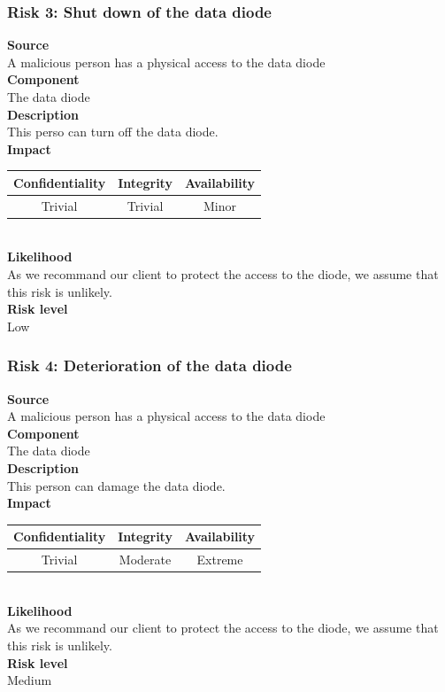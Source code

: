 \documentclass[a4paper,11pt]{article}
\begin{document}
\subsubsection{Risk 3: Shut down of the data diode }
\textbf{Source} \\A malicious person has a physical access to the data diode\\
\textbf{Component} \\The data diode\\
\textbf{Description}\\ This perso can turn off the data diode. \\
\textbf{Impact}\\
\begin{tabular}{|c|c|c|}
\hline
Confidentiality & Integrity & Availability \\
\hline
Trivial & Trivial & Minor \\
\hline
\end{tabular}\\
\textbf{Likelihood}\\ As we recommand our client to protect the access to the diode, we assume that this risk is unlikely.\\
\textbf{Risk level}\\Low\\

\subsubsection{Risk 4: Deterioration of the data diode }
\textbf{Source} \\A malicious person has a physical access to the data diode\\
\textbf{Component} \\The data diode\\
\textbf{Description}\\ This person can damage the data diode.  \\
\textbf{Impact}\\
\begin{tabular}{|c|c|c|}
\hline
Confidentiality & Integrity & Availability \\
\hline
Trivial & Moderate & Extreme \\
\hline
\end{tabular}\\
\textbf{Likelihood}\\ As we recommand our client to protect the access to the diode, we assume that this risk is unlikely.\\
\textbf{Risk level}\\Medium\\
\end{document}
